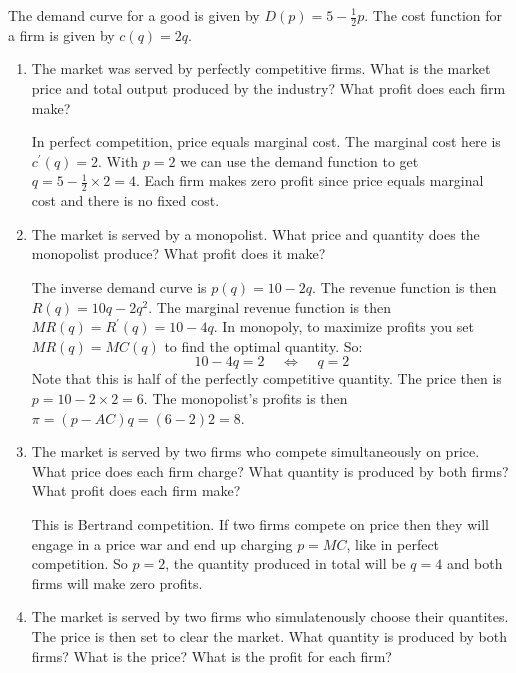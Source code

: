 \documentclass[12pt]{article}
\newcounter{question}[section]
\newenvironment{subquestions}{
  \begin{enumerate}[label=(\roman*)]}{\end{enumerate}}
\begin{document}
The demand curve for a good is given by $D\left( p
\right)=5-\frac{1}{2}p$. The cost function for a firm is given by $c\left( q
\right)=2q$.
\begin{subquestions}
  \item The market was served by perfectly competitive firms.
      What is the market price and total output produced by the industry?  What
      profit does each firm make?

      \textcolor{solution-color}{
        In perfect competition, price equals marginal cost. The marginal cost
        here is $c^\prime\left( q \right)=2$. With $p=2$ we can use the demand
        function to get $q=5-\frac{1}{2}\times 2 = 4$. Each firm makes zero
        profit since price equals marginal cost and there is no fixed cost.
      }
  \item The market is served by a monopolist. What price and quantity does the
    monopolist produce? What profit does it make?

      \textcolor{solution-color}{
        The inverse demand curve is $p\left( q \right)=10-2q$. The revenue
        function is then $R\left( q \right)=10q - 2q^2$. The marginal revenue
        function is then $MR\left( q \right)=R^\prime\left( q \right)=10-4q$.
        In monopoly, to maximize profits you set $MR\left( q \right)=MC\left(
        q \right)$ to find the optimal quantity. So:
        \[
          10-4q=2 \;\;\;\;\Longleftrightarrow \;\;\;\; q=2
        \]
        Note that this is half of the perfectly competitive quantity.
        The price then is $p=10-2\times 2 = 6$. The monopolist's profits is
        then $\pi=\left(p-AC  \right)q = \left( 6-2 \right)2=8$.
      }
  \item The market is served by two firms who compete simultaneously on price.
    What price does each firm charge? What quantity is produced by both firms?
    What profit does each firm make?

    \textcolor{solution-color}{
      This is Bertrand competition. If two firms compete on price then they
      will engage in a price war and end up charging $p=MC$, like in perfect
      competition. So $p=2$, the quantity produced in total will be $q=4$ and
      both firms will make zero profits.
    }
  \item  The market is served by two firms who simulatenously choose their
    quantites. The price is then set to clear the market. What quantity is
    produced by both firms? What is the price? What is the profit for each
    firm?


\end{subquestions}
\end{document}
